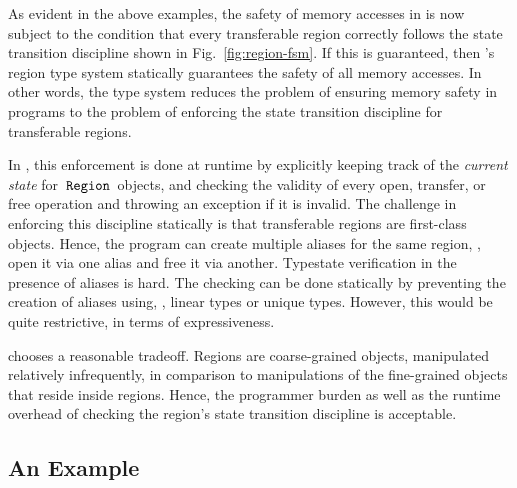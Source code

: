 
As evident in the above examples, the safety of memory accesses in
\name is now subject to the condition that every transferable region
correctly follows the state transition discipline shown
in Fig.~\ref{fig:region-fsm}. If this is
guaranteed, then \name's region type system statically guarantees the
safety of all memory accesses. In other words, the type system reduces
the problem of ensuring memory safety in \name programs to the problem
of enforcing the state transition discipline for transferable regions.

In \name, this enforcement is done at runtime by explicitly keeping
track of the \emph{current state} for $\,{\tt Region}\,$ objects, and
checking the validity of every open, transfer, or free operation
and throwing an exception if it is invalid.
The challenge in enforcing this discipline statically is that transferable regions
are first-class objects. Hence, the program can create multiple aliases for
the same region, \eg, open it via one alias and free it via another.
Typestate verification in the presence of aliases is hard.
The checking can be done statically by preventing the creation of aliases using, \eg, linear types
or unique types. However, this would be quite restrictive, in terms of expressiveness.

\name chooses a reasonable tradeoff. Regions are coarse-grained objects, manipulated relatively infrequently,
in comparison to manipulations of the fine-grained objects that reside inside regions. Hence, the programmer burden
as well as the runtime overhead of checking the region's state transition discipline is acceptable.



% 

\subsection{An Example}

